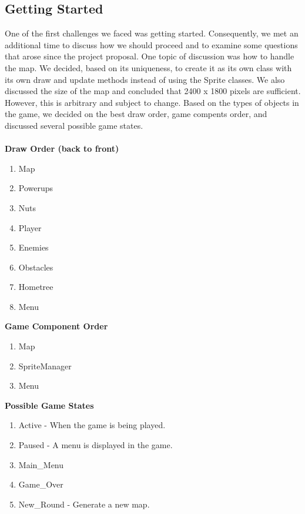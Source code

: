 \documentclass[]{article}
\begin{document}
		\subsection{Getting Started}
			One of the first challenges we faced was getting started.  Consequently, we met an additional time to discuss how we should proceed and to examine some questions that arose since the project proposal.  One topic of discussion was how to handle the map.  We decided, based on its uniqueness, to create it as its own class with its own draw and update methods instead of using the Sprite classes.  We also discussed the size of the map and concluded that 2400 x 1800 pixels are sufficient.  However, this is arbitrary and subject to change.  Based on the types of objects in the game, we decided on the best draw order, game compents order, and discussed several possible game states.\\\\
			\textbf{Draw Order (back to front)}
			\begin{enumerate}
				\item Map
				\item Powerups
				\item Nuts
				\item Player
				\item Enemies
				\item Obstacles
				\item Hometree
				\item Menu
			\end{enumerate}
			\textbf{Game Component Order}
			\begin{enumerate}
				\item Map
				\item SpriteManager
				\item Menu
			\end{enumerate}
			\textbf{Possible Game States}
			\begin{enumerate}
				\item Active - When the game is being played.
				\item Paused - A menu is displayed in the game.
				\item Main\_Menu
				\item Game\_Over
				\item New\_Round - Generate a new map.
			\end{enumerate}
\end{document}

